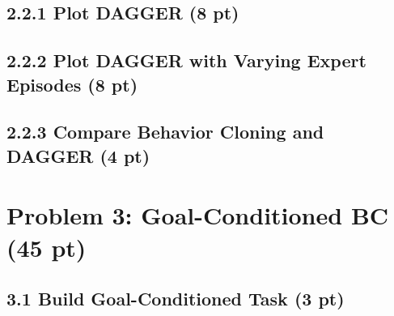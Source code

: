 \documentclass[12pt]{article}
\begin{document}
\subsection*{2.2.1 Plot DAGGER (8 pt)}
\begin{tcolorbox}[fit,height=20em, width=40em, blank, borderline={1pt}{1pt},nobeforeafter]
            \begin{center}
            \end{center}
            \end{tcolorbox}
            
\subsection*{2.2.2 Plot DAGGER with Varying Expert Episodes (8 pt)}
\begin{tcolorbox}[fit,height=25em, width=40em, blank, borderline={1pt}{1pt},nobeforeafter]
            \begin{center}
\end{center}
\end{tcolorbox}

\subsection*{2.2.3 Compare Behavior Cloning and DAGGER (4 pt)}
\begin{tcolorbox}[fit,height=24em, width=40em, blank, borderline={1pt}{1pt},nobeforeafter]
            \begin{center}

\end{center}
\end{tcolorbox}

\clearpage
\section*{Problem 3: Goal-Conditioned BC (45 pt)}

\subsection*{3.1 Build Goal-Conditioned Task (3 pt)}

\begin{tcolorbox}[fit,height=16em, width=40em, blank, borderline={1pt}{1pt},nobeforeafter]
\begin{center}

\end{center}
\end{tcolorbox}
\end{document}
